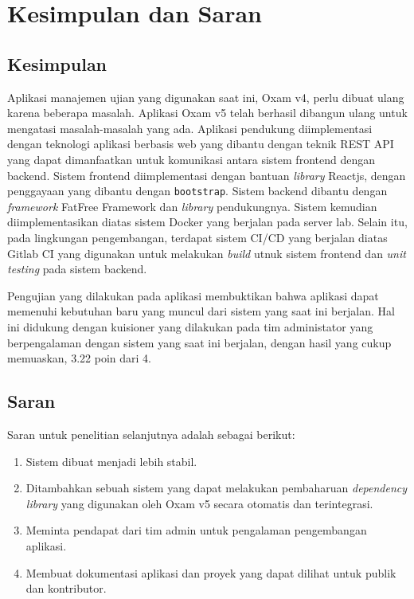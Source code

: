 \chapter{Kesimpulan dan Saran}
\label{chap:kesimpulan-saran}

\section{Kesimpulan}
    Aplikasi manajemen ujian yang digunakan saat ini, Oxam v4, perlu dibuat ulang karena beberapa masalah. 
    Aplikasi Oxam v5 telah berhasil dibangun ulang untuk mengatasi masalah-masalah yang ada.
    Aplikasi pendukung diimplementasi dengan teknologi aplikasi berbasis web yang dibantu dengan teknik REST API
    yang dapat dimanfaatkan untuk komunikasi antara sistem frontend dengan backend. Sistem frontend diimplementasi
    dengan bantuan \textit{library} Reactjs, dengan penggayaan yang dibantu dengan \texttt{bootstrap}. Sistem
    backend dibantu dengan \textit{framework} FatFree Framework dan \textit{library} pendukungnya. Sistem
    kemudian diimplementasikan diatas sistem Docker yang berjalan pada server lab. Selain itu, pada lingkungan
    pengembangan, terdapat sistem CI/CD yang berjalan diatas Gitlab CI yang digunakan untuk melakukan
    \textit{build} utnuk sistem frontend dan \textit{unit testing} pada sistem backend.
    
    Pengujian yang dilakukan pada aplikasi membuktikan  bahwa aplikasi dapat memenuhi kebutuhan baru yang muncul
    dari sistem yang saat ini berjalan. Hal ini didukung dengan kuisioner yang dilakukan pada tim administator
    yang berpengalaman dengan sistem yang saat ini berjalan, dengan hasil yang cukup memuaskan, 3.22 poin dari 4.
    
\section{Saran}
    Saran untuk penelitian selanjutnya adalah sebagai berikut:
    \begin{enumerate}
        \item Sistem dibuat menjadi lebih stabil.
        \item Ditambahkan sebuah sistem yang dapat melakukan pembaharuan \textit{dependency library} yang
            digunakan oleh Oxam v5 secara otomatis dan terintegrasi.
        \item Meminta pendapat dari tim admin untuk pengalaman pengembangan aplikasi.
        \item Membuat dokumentasi aplikasi dan proyek yang dapat dilihat untuk publik dan kontributor.
    \end{enumerate}